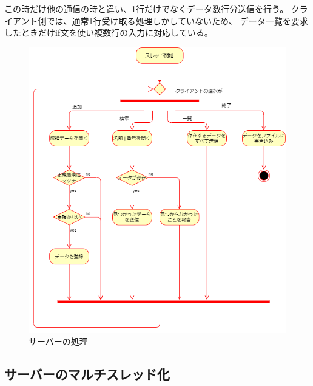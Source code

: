 \documentclass[dvipdfmx]{jsarticle}
\begin{document}
この時だけ他の通信の時と違い、1行だけでなくデータ数行分送信を行う。
クライアント側では、通常1行受け取る処理しかしていないため、
データ一覧を要求したときだけif文を使い複数行の入力に対応している。

\begin{figure}[H]
  \centering
  \includegraphics[width=0.9\hsize]{../pic/flowchart2.png}
  \caption{サーバーの処理}
  \label{fc2}
\end{figure}

\subsection{サーバーのマルチスレッド化}
\end{document}
